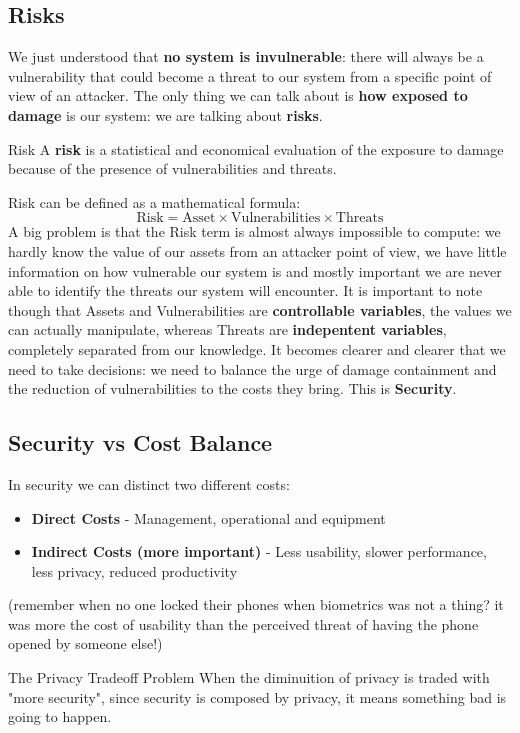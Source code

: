\subsection{Risks}
We just understood that \textbf{no system is invulnerable}: there will always
 be a vulnerability that could become a threat to our system from a 
 specific point of view of an attacker. The only thing we can talk about is 
 \textbf{how exposed to damage} is our system: we are talking about 
 \textbf{risks}.
\begin{key}{Risk}
    A \textbf{risk} is a statistical and economical evaluation of the exposure
    to damage because of the presence of vulnerabilities and threats.
\end{key}
Risk can be defined as a mathematical formula:
\begin{equation}
    \text{Risk} = \text{Asset} \times \text{Vulnerabilities} \times 
    \text{Threats}
\end{equation}
A big problem is that the Risk term is almost always impossible to compute: we
hardly know the value of our assets from an attacker point of view, we have
little information on how vulnerable our system is and mostly important we are
never able to identify the threats our system will encounter. It is important
to note though that Assets and Vulnerabilities are 
\textbf{controllable variables}, the values we can actually manipulate, whereas
Threats are \textbf{indepentent variables}, completely separated from our 
knowledge. It becomes clearer and clearer that we need to take decisions:
we need to balance the urge of damage containment and the reduction of 
vulnerabilities to the costs they bring. This is \textbf{Security}.

\subsection{Security vs Cost Balance}
In security we can distinct two different costs:
\begin{itemize}
    \item \textbf{Direct Costs} - Management, operational and equipment
    \item \textbf{Indirect Costs (more important)} - Less usability, slower
    performance, less privacy, reduced productivity
\end{itemize}
(remember when no one locked their phones when biometrics was not a thing? 
it was more the cost of usability than the perceived threat of having the 
phone opened by someone else!)
\begin{warning}{The Privacy Tradeoff Problem}
    When the diminuition of privacy is traded with "more security", since 
    security is composed by privacy, it means something bad is going to happen. 
\end{warning}

